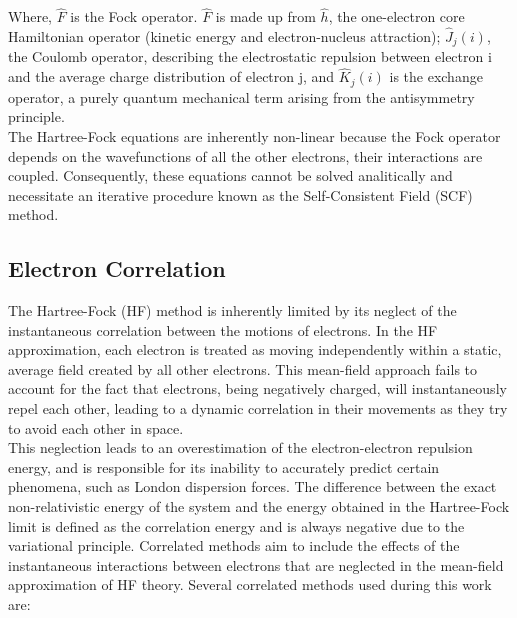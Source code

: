 Where, $\hat{F}$ is the Fock operator. $\hat{F}$ is made up from $\hat{h}$, the one-electron core Hamiltonian operator (kinetic energy and electron-nucleus attraction); $\hat{J}_j(i)$, the Coulomb operator, describing the electrostatic repulsion between electron i and the average charge distribution of electron j, and $\hat{K}_j(i)$ is the exchange operator, a purely quantum mechanical term arising from the antisymmetry principle. \\
The Hartree-Fock equations are inherently non-linear because the Fock operator depends on the wavefunctions of all the other electrons, their interactions are coupled. Consequently, these equations cannot be solved analitically and necessitate an iterative procedure known as the Self-Consistent Field (SCF) method.

\subsection{Electron Correlation}
\label{subsec:electron_correlation}
The Hartree-Fock (HF) method is inherently limited by its neglect of the instantaneous correlation between the motions of electrons. In the HF approximation, each electron is treated as moving independently within a static, average field created by all other electrons. This mean-field approach fails to account for the fact that electrons, being negatively charged, will instantaneously repel each other, leading to a dynamic correlation in their movements as they try to avoid each other in space.\\
This neglection leads to an overestimation of the electron-electron repulsion energy, and is responsible for its inability to accurately predict certain phenomena, such as London dispersion forces. The difference between the exact non-relativistic energy of the system and the energy obtained in the Hartree-Fock limit is defined as the correlation energy and is always negative due to the variational principle. Correlated methods aim to include the effects of the instantaneous interactions between electrons that are neglected in the mean-field approximation of HF theory. Several correlated methods used during this work are:

